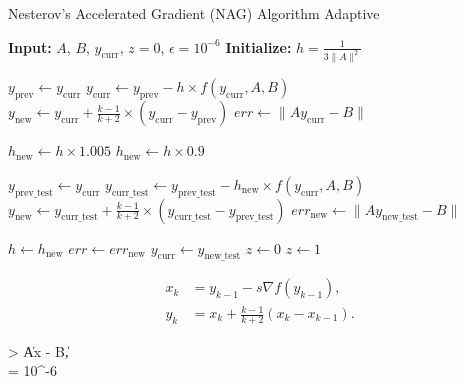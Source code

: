 \documentclass[11pt]{article}
\begin{document}
\begin{algorithm}[H]
\caption{Nesterov's Accelerated Gradient (NAG) Algorithm Adaptive}
\begin{algorithmic}
\State \textbf{Input:}  $A$, $B$, $y_{\text{curr}}$,  $z = 0$,  $\epsilon = 10^{-6}$
\State \textbf{Initialize:}  $h = \frac{1}{3\|A\|^2}$


    \State $y_{\text{prev}} \gets y_{\text{curr}}$
    \State $y_{\text{curr}} \gets y_{\text{prev}} - h \times f(y_{\text{curr}}, A, B)$
    \State $y_{\text{new}} \gets y_{\text{curr}} + \frac{k-1}{k+2} \times (y_{\text{curr}} - y_{\text{prev}})$
    \State $err \gets \|A y_{\text{curr}} - B\|$

        \State $h_{\text{new}} \gets h \times 1.005$ 
    \Else
        \State $h_{\text{new}} \gets h \times 0.9$ 
    \EndIf

    
    \State $y_{\text{prev\_test}} \gets y_{\text{curr}}$ 
    \State $y_{\text{curr\_test}} \gets y_{\text{prev\_test}} - h_{\text{new}} \times f(y_{\text{curr}}, A, B)$
    \State $y_{\text{new}} \gets y_{\text{curr\_test}} + \frac{k-1}{k+2} \times (y_{\text{curr\_test}} - y_{\text{prev\_test}})$
    \State $err_{\text{new}} \gets \|A y_{\text{new\_test}} - B\|$

        \State $h \gets h_{\text{new}}$
        \State $err \gets err_{\text{new}}$
        \State $y_{\text{curr}} \gets y_{\text{new\_test}}$
        \State $z \gets 0$ 
    \Else
        \State $z \gets 1$ 
    \EndIf

\EndWhile
\end{algorithmic}
\end{algorithm}

\begin{align*}
x_k &= y_{k-1} - s \nabla f(y_{k-1}), \\
y_k &= x_k + \frac{k-1}{k+2} (x_k - x_{k-1}).
\end{align*}

 \epsilon > \|Ax - B\|,  \\
 \epsilon {} \epsilon = 10^{-6} 
\end{document}
